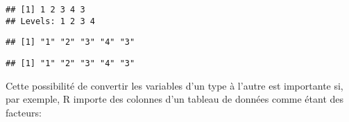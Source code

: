 \begin{knitrout}
\begin{kframe}
\begin{flushleft}
\ttfamily\noindent
{}\hlkeyword{(}\hlkeyword{(}\hlkeyword{,}{\ }\hlkeyword{,}{\ }\hlkeyword{,}{\ }\hlkeyword{,}{\ }\hlkeyword{)}\hlkeyword{)}\mbox{}
\normalfont
\end{flushleft}
\begin{verbatim}
## [1] 1 2 3 4 3
## Levels: 1 2 3 4
\end{verbatim}
\begin{flushleft}
\ttfamily\noindent
{}\hlkeyword{(}\hlkeyword{(}\hlkeyword{(}\hlkeyword{,}{\ }\hlkeyword{,}{\ }\hlkeyword{,}{\ }\hlkeyword{,}{\ }\hlkeyword{)}\hlkeyword{)}\hlkeyword{)}\mbox{}
\normalfont
\end{flushleft}
\begin{verbatim}
## [1] "1" "2" "3" "4" "3"
\end{verbatim}
\begin{flushleft}
\ttfamily\noindent
{}\hlkeyword{(}\hlkeyword{(}\hlkeyword{(}\hlkeyword{,}{\ }\hlkeyword{,}{\ }\hlkeyword{,}{\ }\hlkeyword{,}{\ }\hlkeyword{)}\hlkeyword{)}\hlkeyword{)}\mbox{}
\normalfont
\end{flushleft}
\begin{verbatim}
## [1] "1" "2" "3" "4" "3"
\end{verbatim}
\end{kframe}
\end{knitrout}


Cette possibilité de convertir les variables d'un type à l'autre est importante si, par exemple, R importe des colonnes d'un tableau de données comme étant des facteurs:

\begin{knitrout}
\color{fgcolor}\begin{kframe}
\begin{flushleft}
\ttfamily\noindent
{}\hlkeyword{\usebox{\hlnormalsizeboxdollar}}\hlassignement{\usebox{\hlnormalsizeboxlessthan}-}{\ }\hlkeyword{(}\hlkeyword{(}\hlkeyword{\usebox{\hlnormalsizeboxdollar}}\hlkeyword{)}\hlkeyword{)}\mbox{}
\normalfont
\end{flushleft}
\end{kframe}
\end{knitrout}


